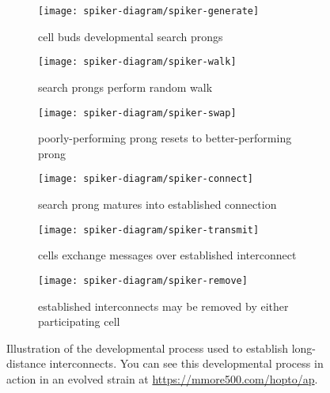 \begin{figure}[!htbp]
\begin{center}

\begin{minipage}{\linewidth}
\begin{center}
\begin{subfigure}[t]{0.25\linewidth}
  \texttt{[image: spiker-diagram/spiker-generate]}
  \caption{cell buds developmental search prongs}
  \label{fig:spiker-generate}
\end{subfigure}
	\hspace{2ex}
\begin{subfigure}[t]{0.25\linewidth}
  \texttt{[image: spiker-diagram/spiker-walk]}
  \caption{search prongs perform random walk}
  \label{fig:spiker-walk}
\end{subfigure}
  \hspace{2ex}
\begin{subfigure}[t]{0.25\linewidth}
  \texttt{[image: spiker-diagram/spiker-swap]}
  \caption{poorly-performing prong resets to better-performing prong}
  \label{fig:spiker-swap}
\end{subfigure}
\end{center}
\end{minipage}

\begin{minipage}{\linewidth}
\begin{center}
\begin{subfigure}[t]{0.25\linewidth}
  \texttt{[image: spiker-diagram/spiker-connect]}
  \caption{search prong matures into established connection}
  \label{fig:spiker-connect}
\end{subfigure}
  \hspace{2ex}
\begin{subfigure}[t]{0.25\linewidth}
  \texttt{[image: spiker-diagram/spiker-transmit]}
  \caption{cells exchange messages over established interconnect}
  \label{fig:spiker-transmit}
\end{subfigure}
   \hspace{2ex}
\begin{subfigure}[t]{0.25\linewidth}
  \texttt{[image: spiker-diagram/spiker-remove]}
  \caption{established interconnects may be removed by either participating cell}
  \label{fig:spiker-remove}
\end{subfigure}
\end{center}
\end{minipage}

\caption{
Illustration of the developmental process used to establish long-distance interconnects.
You can see this developmental process in action in an evolved strain at \url{https://mmore500.com/hopto/ap}.
}
\label{fig:spiker_diagram}
\end{center}
\end{figure}
